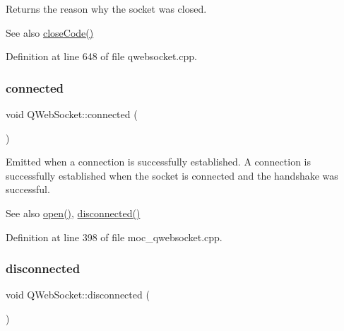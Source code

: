 Returns the reason why the socket was closed. 

\begin{DoxySeeAlso}{See also}
\mbox{\hyperlink{class_q_web_socket_ac0392e28fa81d5452868813d5e907d71}{close\+Code()}} 
\end{DoxySeeAlso}


Definition at line 648 of file qwebsocket.\+cpp.

\mbox{\label{class_q_web_socket_a176c51371ba6d3b13fec0f7f287b6102}} 
\subsubsection{\texorpdfstring{connected}{connected}}
{\footnotesize\ttfamily void Q\+Web\+Socket\+::connected (\begin{DoxyParamCaption}{ }\end{DoxyParamCaption})\hspace{0.3cm}{\ttfamily [signal]}}



Emitted when a connection is successfully established. A connection is successfully established when the socket is connected and the handshake was successful. 

\begin{DoxySeeAlso}{See also}
\mbox{\hyperlink{class_q_web_socket_ac0351c89316b6914a58bc2f5c8ed9e6b}{open()}}, \mbox{\hyperlink{class_q_web_socket_aaba1f43d105bea22b4021a68f924169b}{disconnected()}} 
\end{DoxySeeAlso}


Definition at line 398 of file moc\+\_\+qwebsocket.\+cpp.

\mbox{\label{class_q_web_socket_aaba1f43d105bea22b4021a68f924169b}} 
\subsubsection{\texorpdfstring{disconnected}{disconnected}}
{\footnotesize\ttfamily void Q\+Web\+Socket\+::disconnected (\begin{DoxyParamCaption}{ }\end{DoxyParamCaption})\hspace{0.3cm}{\ttfamily [signal]}}



